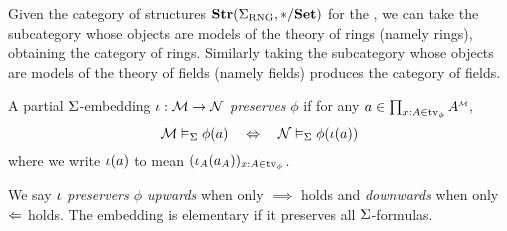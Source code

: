 
\begin{eg}
    Given the category of structures $\mathbf{Str}(\Sigma_{\mathrm{RNG}} , * / \mathbf{Set})$ for the 
    , 
    we can take the subcategory whose objects are models 
    of the theory of rings (namely rings), 
    obtaining the category of rings.
    Similarly taking the subcategory whose objects are models of the 
    theory of fields (namely fields) produces the category of fields.
\end{eg}

\begin{dfn}
    A partial $\Sigma$-embedding $\iota : \mathcal{M} \to \mathcal{N}$ 
    \textit{preserves} $\phi$ if for any 
    $a \in \prod_{x : A \in \tv{\phi}} \mmintp{A}$,
    \[
        \mathcal{M} \vDash_{\Sigma} \phi(a) \quad \Leftrightarrow \quad \mathcal{N} \vDash_{\Sigma} \phi(\iota(a))
    \]
    where we write $\iota(a)$ to mean $(\iota_{A}(a_A))_{x : A \in \textrm{tv}_{\phi}}$.

    We say $\iota$ \textit{preservers $\phi$ upwards} when only $\implies$ holds 
    and \textit{downwards} when only $\Leftarrow$ holds.
    The embedding is elementary if it preserves all $\Sigma$-formulas.
\end{dfn}

